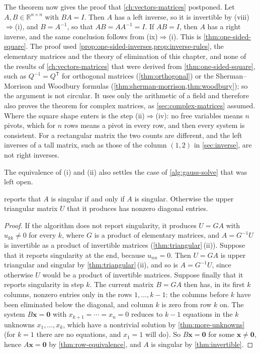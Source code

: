 The theorem now gives the proof that \cref{ch:vectors-matrices} postponed. Let $A,B\in\mathbb R^{n\times n}$ with $BA=I$. Then $A$ has a left inverse, so it is invertible by (viii)$\Rightarrow$(i), and $B=A^{-1}$, so that $AB=AA^{-1}=I$. If $AB=I$, then $A$ has a right inverse, and the same conclusion follows from (ix)$\Rightarrow$(i). This is \cref{thm:one-sided-square}. The proof used \cref{prop:one-sided-inverses,prop:inverse-rules}, the elementary matrices and the theory of elimination of this chapter, and none of the results of \cref{ch:vectors-matrices} that were derived from \cref{thm:one-sided-square}, such as $Q^{-1}=Q^{\mathsf T}$ for orthogonal matrices (\cref{thm:orthogonal}) or the Sherman--Morrison and Woodbury formulas (\cref{thm:sherman-morrison,thm:woodbury}); so the argument is not circular. It uses only the arithmetic of a field and therefore also proves the theorem for complex matrices, as \cref{sec:complex-matrices} assumed. Where the square shape enters is the step (ii)$\Rightarrow$(iv): no free variables means $n$ pivots, which for $n$ rows means a pivot in every row, and then every system is consistent. For a rectangular matrix the two counts are different, and the left inverses of a tall matrix, such as those of the column $(1,2)$ in \cref{sec:inverse}, are not right inverses.

The equivalence of (i) and (ii) also settles the case of \cref{alg:gauss-solve} that was left open.

\begin{proposition}
\label{prop:gauss-singular}
 reports that $A$ is singular if and only if $A$ is singular. Otherwise the upper triangular matrix $U$ that it produces has nonzero diagonal entries.
\end{proposition}

\begin{proof}
If the algorithm does not report singularity, it produces $U=GA$ with $u_{kk}\ne0$ for every $k$, where $G$ is a product of elementary matrices, and $A=G^{-1}U$ is invertible as a product of invertible matrices (\cref{thm:triangular}\,(ii)). Suppose that it reports singularity at the end, because $u_{nn}=0$. Then $U=GA$ is upper triangular and singular by \cref{thm:triangular}\,(ii), and so is $A=G^{-1}U$, since otherwise $U$ would be a product of invertible matrices. Suppose finally that it reports singularity in step $k$. The current matrix $B=GA$ then has, in its first $k$ columns, nonzero entries only in the rows $1,\ldots,k-1$: the columns before $k$ have been eliminated below the diagonal, and column $k$ is zero from row $k$ on. The system $B\mathbf x=\mathbf 0$ with $x_{k+1}=\cdots=x_n=0$ reduces to $k-1$ equations in the $k$ unknowns $x_1,\ldots,x_k$, which have a nontrivial solution by \cref{thm:more-unknowns} (for $k=1$ there are no equations, and $x_1=1$ will do). So $B\mathbf x=\mathbf 0$ for some $\mathbf x\ne\mathbf 0$, hence $A\mathbf x=\mathbf 0$ by \cref{thm:row-equivalence}, and $A$ is singular by \cref{thm:invertible}.
\end{proof}

